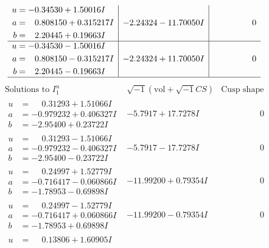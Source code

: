 \documentclass[1p]{elsarticle_modified}
\theoremstyle{definition}
\newcommand{\I}{\sqrt{-1}}
\begin{document}
$$\begin{array}{c|c|c}
\begin{aligned}
u &= -0.34530 + 1.50016 I \\
a &= \phantom{-}0.808150 + 0.315217 I \\
b &= \phantom{-}2.20445 + 0.19663 I\end{aligned}
 & -2.24324 - 11.70050 I & \phantom{-0.000000 } 0 \\ \hline\begin{aligned}
u &= -0.34530 - 1.50016 I \\
a &= \phantom{-}0.808150 - 0.315217 I \\
b &= \phantom{-}2.20445 - 0.19663 I\end{aligned}
 & -2.24324 + 11.70050 I & \phantom{-0.000000 } 0\\
 \hline 
 \end{array}$$\newpage$$\begin{array}{c|c|c}  
\text{Solutions to }I^u_{1}& \I (\text{vol} + \sqrt{-1}CS) & \text{Cusp shape}\\
 \hline 
\begin{aligned}
u &= \phantom{-}0.31293 + 1.51066 I \\
a &= -0.979232 + 0.406327 I \\
b &= -2.95400 + 0.23722 I\end{aligned}
 & -5.7917 + 17.7278 I & \phantom{-0.000000 } 0 \\ \hline\begin{aligned}
u &= \phantom{-}0.31293 - 1.51066 I \\
a &= -0.979232 - 0.406327 I \\
b &= -2.95400 - 0.23722 I\end{aligned}
 & -5.7917 - 17.7278 I & \phantom{-0.000000 } 0 \\ \hline\begin{aligned}
u &= \phantom{-}0.24997 + 1.52779 I \\
a &= -0.716417 - 0.060866 I \\
b &= -1.78953 - 0.69898 I\end{aligned}
 & -11.99200 + 0.79354 I & \phantom{-0.000000 } 0 \\ \hline\begin{aligned}
u &= \phantom{-}0.24997 - 1.52779 I \\
a &= -0.716417 + 0.060866 I \\
b &= -1.78953 + 0.69898 I\end{aligned}
 & -11.99200 - 0.79354 I & \phantom{-0.000000 } 0 \\ \hline\begin{aligned}
u &= \phantom{-}0.13806 + 1.60905 I \\

\end{aligned}
\end{array}$$
\end{document}
